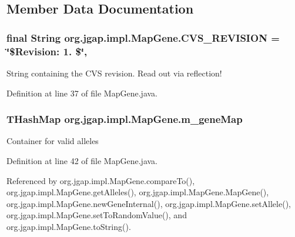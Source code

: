 \subsection{Member Data Documentation}
\hypertarget{classorg_1_1jgap_1_1impl_1_1_map_gene_aa65a07ab87910fd23ef486d0bd4340d6}{
\subsubsection[{C\-V\-S\-\_\-\-R\-E\-V\-I\-S\-I\-O\-N}]{\setlength{\rightskip}{0pt plus 5cm}final String org.\-jgap.\-impl.\-Map\-Gene.\-C\-V\-S\-\_\-\-R\-E\-V\-I\-S\-I\-O\-N = \char`\"{}\$Revision\-: 1. \$\char`\"{}\hspace{0.3cm}{\ttfamily [static]}, {\ttfamily [private]}}}\label{classorg_1_1jgap_1_1impl_1_1_map_gene_aa65a07ab87910fd23ef486d0bd4340d6}
String containing the C\-V\-S revision. Read out via reflection! 

Definition at line 37 of file Map\-Gene.\-java.

\hypertarget{classorg_1_1jgap_1_1impl_1_1_map_gene_a01e13b3562f441aa9be32547a0d462c8}{
\subsubsection[{m\-\_\-gene\-Map}]{\setlength{\rightskip}{0pt plus 5cm}T\-Hash\-Map org.\-jgap.\-impl.\-Map\-Gene.\-m\-\_\-gene\-Map\hspace{0.3cm}{\ttfamily [private]}}}\label{classorg_1_1jgap_1_1impl_1_1_map_gene_a01e13b3562f441aa9be32547a0d462c8}
Container for valid alleles 

Definition at line 42 of file Map\-Gene.\-java.



Referenced by org.\-jgap.\-impl.\-Map\-Gene.\-compare\-To(), org.\-jgap.\-impl.\-Map\-Gene.\-get\-Alleles(), org.\-jgap.\-impl.\-Map\-Gene.\-Map\-Gene(), org.\-jgap.\-impl.\-Map\-Gene.\-new\-Gene\-Internal(), org.\-jgap.\-impl.\-Map\-Gene.\-set\-Allele(), org.\-jgap.\-impl.\-Map\-Gene.\-set\-To\-Random\-Value(), and org.\-jgap.\-impl.\-Map\-Gene.\-to\-String().

